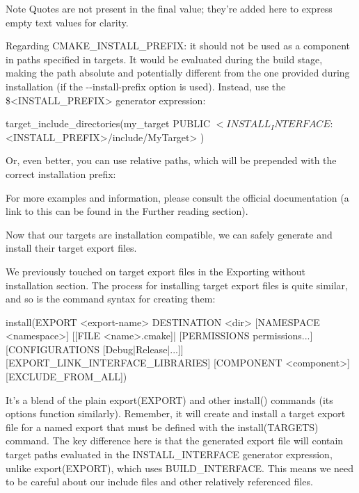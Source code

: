 \begin{myNotic}{Note}
Quotes are not present in the final value; they’re added here to express empty text values for clarity.
\end{myNotic}

Regarding CMAKE\_INSTALL\_PREFIX: it should not be used as a component in paths specified in targets. It would be evaluated during the build stage, making the path absolute and potentially different from the one provided during installation (if the -{}-install-prefix option is used). Instead, use the \$<INSTALL\_PREFIX> generator expression:

\begin{cmake}
target_include_directories(my_target PUBLIC
    $<INSTALL_INTERFACE:$<INSTALL_PREFIX>/include/MyTarget>
)
\end{cmake}

Or, even better, you can use relative paths, which will be prepended with the correct installation prefix:


For more examples and information, please consult the official documentation (a link to this can be found in the Further reading section).

Now that our targets are installation compatible, we can safely generate and install their target export files.


We previously touched on target export files in the Exporting without installation section. The process for installing target export files is quite similar, and so is the command syntax for creating them:

\begin{cmake}
install(EXPORT <export-name> DESTINATION <dir>
        [NAMESPACE <namespace>] [[FILE <name>.cmake]|
        [PERMISSIONS permissions...]
        [CONFIGURATIONS [Debug|Release|...]]
        [EXPORT_LINK_INTERFACE_LIBRARIES]
        [COMPONENT <component>]
        [EXCLUDE_FROM_ALL])
\end{cmake}

It’s a blend of the plain export(EXPORT) and other install() commands (its options function similarly). Remember, it will create and install a target export file for a named export that must be defined with the install(TARGETS) command. The key difference here is that the generated export file will contain target paths evaluated in the INSTALL\_INTERFACE generator expression, unlike export(EXPORT), which uses BUILD\_INTERFACE. This means we need to be careful about our include files and other relatively referenced files.

